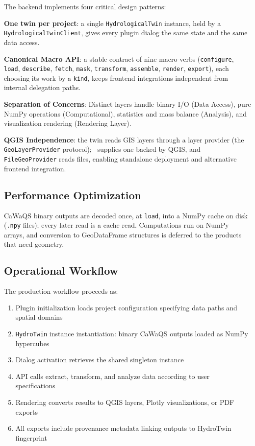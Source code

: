 The backend implements four critical design patterns:

\textbf{One twin per project}: a single \texttt{HydrologicalTwin} instance, held by a \texttt{HydrologicalTwinClient}, gives every plugin dialog the same state and the same data access.

\textbf{Canonical Macro API}: a stable contract of nine macro-verbs (\texttt{configure}, \texttt{load}, \texttt{describe}, \texttt{fetch}, \texttt{mask}, \texttt{transform}, \texttt{assemble}, \texttt{render}, \texttt{export}), each choosing its work by a \texttt{kind}, keeps frontend integrations independent from internal delegation paths.

\textbf{Separation of Concerns}: Distinct layers handle binary I/O (Data Access), pure NumPy operations (Computational), statistics and mass balance (Analysis), and visualization rendering (Rendering Layer).

\textbf{QGIS Independence}: the twin reads GIS layers through a layer provider (the \texttt{GeoLayerProvider} protocol); \cwv\ supplies one backed by QGIS, and \texttt{FileGeoProvider} reads files, enabling standalone deployment and alternative frontend integration.

\subsection{Performance Optimization}

CaWaQS binary outputs are decoded once, at \texttt{load}, into a NumPy cache on disk (\texttt{.npy} files); every later read is a cache read. Computations run on NumPy arrays, and conversion to GeoDataFrame structures is deferred to the products that need geometry.

\subsection{Operational Workflow}

The production workflow proceeds as:
\begin{enumerate}
\item Plugin initialization loads project configuration specifying data paths and spatial domains
\item \texttt{HydroTwin} instance instantiation: binary CaWaQS outputs loaded as NumPy hypercubes
\item Dialog activation retrieves the shared singleton instance
\item API calls extract, transform, and analyze data according to user specifications
\item Rendering converts results to QGIS layers, Plotly visualizations, or PDF exports
\item All exports include provenance metadata linking outputs to HydroTwin fingerprint
\end{enumerate}

